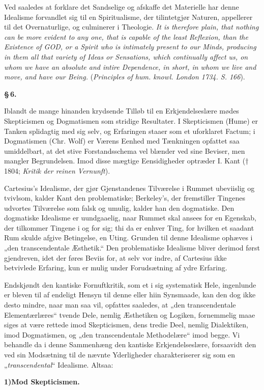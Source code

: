 \documentclass[12pt]{book}
\newcommand{\opage}[1]{\marginnote{\footnotesize\textit{[#1]}}}
\begin{document}
Ved saaledes at forklare det Sandselige og afskaffe det Materielle har denne
Idealisme forvandlet sig til en Spiritualisme, der tilintetgjør Naturen, appellerer
til det Overnaturlige, og culminerer i Theologie. \textit{It is therefore plain,
that nothing can be more evident to any one, that is capable of the least
Reflexion, than the Existence of GOD, or a Spirit who is intimately present to our
Minds, producing in them all that variety of Ideas or Sensations, which continually
affect us, on whom we have an absolute and intire Dependence, in short, in whom we
live and move, and have our Being.} (\textit{Principles of hum. knowl. London 1734.
S. 166}).
\opage{23} \begin{center}{\bfseries \S\,6.}\end{center}

Iblandt de mange hinanden krydsende Tilløb til en Erkjendelseslære mødes
Skepticismen og Dogmatismen som stridige Resultater. I Skepticismen (Hume) er
Tanken splidagtig med sig selv, og Erfaringen staaer som et uforklaret Factum; i
Dogmatismen (Chr. Wolf) er Værens Eenhed med Tænkningen opfattet saa umiddelbart,
at det stive Forstandsschema vel blænder ved sine Beviser, men mangler
Begrundelsen. Imod disse mægtige Eensidigheder optræder I. Kant († 1804;
\textit{Kritik der reinen Vernunft}).

Cartesius's Idealisme, der gjør Gjenstandenes Tilværelse i Rummet ubeviislig og
tvivlsom, kalder Kant den problematiske; Berkeley's, der fremstiller Tingenes
udvortes Tilværelse som falsk og umulig, kalder han den dogmatiske. Den dogmatiske
Idealisme er uundgaaelig, naar Rummet skal ansees for en Egenskab, der tilkommer
Tingene i og for sig; thi da er enhver Ting, for hvilken et saadant Rum skulde
afgive Betingelse, en Uting. Grunden til denne Idealisme ophæves i „den
transcendentale Æsthetik.“ Den problematiske Idealisme bliver derimod først
gjendreven, idet der føres Beviis for, at selv vor indre, af Cartesius ikke
betvivlede Erfaring, kun er mulig under Forudsætning af ydre Erfaring.

Endskjøndt den kantiske Fornuftkritik, som et i sig systematisk Hele, ingenlunde er
bleven til af endeligt Hensyn til denne eller hiin Synsmaade, kan den dog ikke
desto mindre, naar man saa vil, opfattes saaledes, at „den transcendentale
Elementærlæres“ tvende Dele, nemlig Æsthetiken og Logiken, fornemmelig maae siges
at være rettede imod Skepticismen, dens tredie Deel, nemlig Dialektiken, imod
Dogmatismen, og „den transcendentale Methodelære“ imod begge. Vi behandle da i
denne Sammenhæng den kantiske Erkjendelseslære, forsaavidt den ved sin Modsætning
til de nævnte Yderligheder charakteriserer sig som en „\emph{transcendental}“
Idealisme. Altsaa:
\opage{24} \begin{center}{\bfseries 1)\quad Mod Skepticismen.}\end{center}
\end{document}
